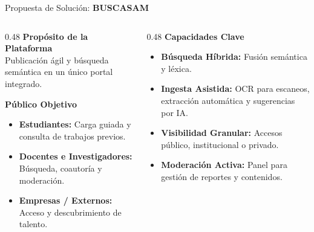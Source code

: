 \documentclass[11pt,aspectratio=169]{beamer}
\newcommand{\wordmark}{\textbf{\color{ink}BUSCA\color{brand}SAM}}
\begin{document}
\begin{frame}{Propuesta de Solución: \wordmark}
  \small
  \begin{columns}[T]
    \begin{column}{0.48\textwidth}
      {\headingfont\bfseries\color{brandlt}Propósito de la Plataforma}\\[0.05cm]
      Publicación ágil y búsqueda semántica en un único portal integrado.

      \vspace{0.12cm}
      {\headingfont\bfseries\color{brandlt}Público Objetivo}\\[0.05cm]
      \begin{itemize}
        \item \textbf{Estudiantes:} Carga guiada y consulta de trabajos previos.
        \item \textbf{Docentes e Investigadores:} Búsqueda, coautoría y moderación.
        \item \textbf{Empresas / Externos:} Acceso y descubrimiento de talento.
      \end{itemize}
    \end{column}

    \begin{column}{0.48\textwidth}
      {\headingfont\bfseries\color{brandlt}Capacidades Clave}\\[0.05cm]
      \begin{itemize}
        \item \textbf{Búsqueda Híbrida:} Fusión semántica y léxica.
        \item \textbf{Ingesta Asistida:} OCR para escaneos, extracción automática y sugerencias por IA.
        \item \textbf{Visibilidad Granular:} Accesos público, institucional o privado.
        \item \textbf{Moderación Activa:} Panel para gestión de reportes y contenidos.
      \end{itemize}
    \end{column}
  \end{columns}
\end{frame}
\end{document}
